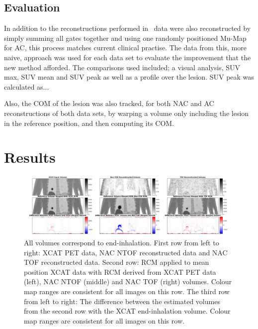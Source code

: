 \documentclass[10pt, twocolumn, twoside, letterpaper]{IEEEtran}
\begin{document}
    \subsection{Evaluation} \label{sec:evaluation}
        In addition to the reconstructions performed in~ data were also reconstructed by simply summing all gates together and using one randomly positioned \gls{Mu-Map} for \gls{AC}, this process matches current clinical practise. The data from this, more naive, approach was used for each data set to evaluate the improvement that the new method afforded. The comparisons used included; a visual analysis, \gls{SUV} max, \gls{SUV} mean and \gls{SUV} peak as well as a profile over the lesion. \gls{SUV} peak was calculated as...
        
        Also, the \gls{COM} of the lesion was also tracked, for both \gls{NAC} and \gls{AC} reconstructions of both data sets, by warping a volume only including the lesion in the reference position, and then computing its \gls{COM}.

\section{Results} \label{sec:results}
    \begin{figure}[!ht]
        \centering
        \includegraphics[width=1.0\linewidth]{figures/output.png}
        \captionsetup{singlelinecheck=false, justification=centering}
        \caption{All volumes correspond to end-inhalation. First row from left to right: \gls{XCAT} \gls{PET} data, \gls{NAC} \gls{NTOF} reconstructed data and \gls{NAC} \gls{TOF} reconstructed data. Second row: \gls{RCM} applied to mean position \gls{XCAT} data with \gls{RCM} derived from \gls{XCAT} \gls{PET} data (left), \gls{NAC} \gls{NTOF} (middle) and \gls{NAC} \gls{TOF} (right) volumes. Colour map ranges are consistent for all images on this row. The third row from left to right: The difference between the estimated volumes from the second row with the \gls{XCAT} end-inhalation volume. Colour map ranges are consistent for all images on this row.}
        \label{fig:output}
    \end{figure}
    
\end{document}
